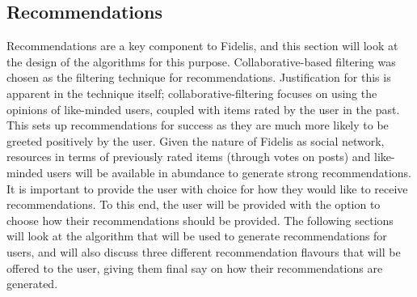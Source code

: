 \subsection{Recommendations}
Recommendations are a key component to Fidelis, and this section will look at the design of the algorithms for this purpose. Collaborative-based filtering was chosen as the filtering technique for recommendations. Justification for this is apparent in the technique itself; collaborative-filtering focuses on using the opinions of like-minded users, coupled with items rated by the user in the past. This sets up recommendations for success as they are much more likely to be greeted positively by the user. Given the nature of Fidelis as social network, resources in terms of previously rated items (through votes on posts) and like-minded users will be available in abundance to generate strong recommendations. It is important to provide the user with choice for how they would like to receive recommendations. To this end, the user will be provided with the option to choose how their recommendations should be provided. The following sections will look at the algorithm that will be used to generate recommendations for users, and will also discuss three different recommendation flavours that will be offered to the user, giving them final say on how their recommendations are generated. 

